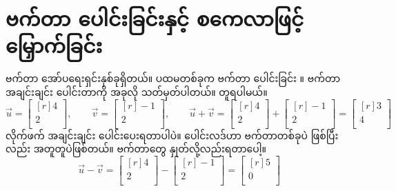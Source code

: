 \section{ဗက်တာ ပေါင်းခြင်းနှင့် စကေလာဖြင့် မြှောက်ခြင်း}
ဗက်တာ အော်ပရေးရှင်းနှစ်ခုရှိတယ်။ ပထမတစ်ခုက ဗက်တာ ပေါင်းခြင်း ။  ဗက်တာအချင်းချင်း ပေါင်းတာကို အခုလို သတ်မှတ်ပါတယ်။  တူရပါမယ်။
%
\[
\vec{u} = \begin{bmatrix*}[r] 4\\ 2\\ \end{bmatrix*}, \qquad
\vec{v} = \begin{bmatrix*}[r] -1\\ 2\\ \end{bmatrix*}, \qquad
\vec{u} + \vec{v} = \begin{bmatrix*}[r] 4\\ 2\\ \end{bmatrix*} +  \begin{bmatrix*}[r] -1\\ 2\\ \end{bmatrix*} = \begin{bmatrix*}[r] 3\\ 4\\ \end{bmatrix*}
\]
%
လိုက်ဖက်  အချင်းချင်း ပေါင်းပေးရတာပါပဲ။ ပေါင်းလဒ်ဟာ ဗက်တာတစ်ခုပဲ ဖြစ်ပြီး  လည်း အတူတူပဲဖြစ်တယ်။ ဗက်တာတွေ နှုတ်လို့လည်းရတာပေါ့။ 
%
\[
\vec{u} - \vec{v} = \begin{bmatrix*}[r] 4\\ 2\\ \end{bmatrix*} -  \begin{bmatrix*}[r] -1\\ 2\\ \end{bmatrix*} = \begin{bmatrix*}[r] 5\\ 0\\ \end{bmatrix*}
\]
%

